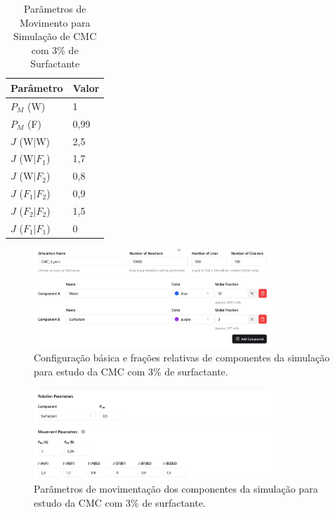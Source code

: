 \documentclass[12pt,oneside]{report}
\begin{document}
\begin{table}[H]
    \centering
    \caption{Parâmetros de Movimento para Simulação de CMC com 3\% de Surfactante}
    \vspace{0.2cm}
    \begin{tabularx}{\textwidth}{X m{5cm}}
        \hline
        \textbf{Parâmetro} & \textbf{Valor} \\
        \hline
        $P_M$ (W)          & 1              \\
        $P_M$ (F)          & 0{,}99         \\
        $J$ (W$|$W)        & 2{,}5          \\
        $J$ (W$|F_1$)      & 1{,}7          \\
        $J$ (W$|F_2$)      & 0{,}8          \\
        $J$ ($F_1|F_2$)    & 0,9            \\
        $J$ ($F_2|F_2$)    & 1,5            \\
        $J$ ($F_1|F_1$)    & 0              \\
        \hline
    \end{tabularx}
    \vspace{0.2cm}
    \label{tab:mov_surfactant_cmc_3}
\end{table}

\begin{figure}[H]
    \centering
    \includegraphics[width=0.8\textwidth]{img/basic_3perc.png}
    \caption{\small Configuração básica e frações relativas de componentes da simulação para estudo da CMC com 3\% de surfactante.}
    \label{fig:params_surfactant_cmc}
\end{figure}

\begin{figure}[H]
    \centering
    \includegraphics[width=0.8\textwidth]{img/mov_3perc.png}
    \caption{\small Parâmetros de movimentação dos componentes da simulação para estudo da CMC com 3\% de surfactante.}
    \label{fig:params_surfactant_cmc_3}
\end{figure}
\end{document}
